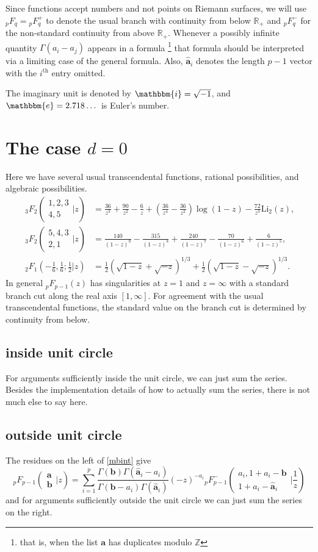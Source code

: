 \documentclass[12pt]{article}
\newcommand{\ee}[0] {\mathbbm{e}}
\newcommand{\ii}[0] {\mathbbm{i}}
\numberwithin{equation}{section}
\newcommand{\FF}[6] {{}_{#1}{#2}_{#3} \left( \begin{array}{c} #4 \\ #5 \end{array} \Big| {#6}  \right)}
\newcommand{\FFe}[7] {{}_{#1}^{\,}{#2}_{#3}^{#4} \left( \begin{array}{c} #5 \\ #6 \end{array} \Big| {#7} \right)}
\newcommand{\FFf}[5] {{}_{#1}{#2}_{#3} \left(#4 | {#5} \right)}
\newcommand{\bfa}[0] {\mathbf{a}}
\begin{document}
Since functions accept numbers and not points on Riemann surfaces, we will use ${}_p F_{q} = {}_p F_{q}^{+}$ to denote the usual branch with continuity from below $\mathbb{R}_{+}$ and ${}_p^{\,} F_{q}^{-}$ for the non-standard continuity from above $\mathbb{R}_{+}$. Whenever a possibly infinite quantity $\Gamma(a_i-a_j)$ appears in a formula \footnote{that is, when the list $\bfa$ has duplicates modulo $\mathbb{Z}$} that formula should be interpreted via a limiting case of the general formula. Also, $\hat{\mathbf{a}}_i$ denotes the length $p-1$ vector with the $i^{\text{th}}$ entry omitted.

The imaginary unit is denoted by $\ii = \sqrt{-1}$, and $\ee = 2.718\dots$ is Euler's number.

\section{The case $d=0$}
Here we have several usual transcendental functions, rational possibilities, and algebraic possibilities.
\begin{align*}
\FF{3}{F}{2}{1,2,3}{4,5}{z} &= \frac{36}{z^3}+\frac{90}{z^2}-\frac{6}{z}+\left
   (\frac{36}{z^4}-\frac{36}{z^2}\right) \log
   (1-z)-\frac{72}{z^3}
   \text{Li}_2(z)\text{,}\\
\FF{3}{F}{2}{5,4,3}{2,1}{z} &= \frac{140}{(1-z)^9}-\frac{315}{(1-z)^8}+\frac{240}{(1-z)^7}-\frac{70}{(1-z)^6}+\frac{6}{(1-z)^5}\text{,}\\
\FFf{2}{F}{1}{-\tfrac{1}{6}, \tfrac{1}{6};\tfrac{1}{2}}{z} &= \tfrac{1}{2} \left(\sqrt{1-z}+\sqrt{-z}\right)^{1/3}+\tfrac{1}{2} \left(\sqrt{1-z}-\sqrt{-z}\right)^{1/3}\text{.}
\end{align*}
In general ${}_{p}F_{p-1}(z)$ has singularities at $z=1$ and $z=\infty$ with a standard branch cut along the real axis $[1,\infty]$. For agreement with the usual transcendental functions, the standard value on the branch cut is determined by continuity from below.

\subsection{inside unit circle}
For arguments sufficiently inside the unit circle, we can just sum the series. Besides the implementation details of how to actually sum the series, there is not much else to say here.

\subsection{outside unit circle}
The residues on the left of \eqref{mbint} give
\begin{equation}
\label{balanced_outside}
\FF{p}{F}{p-1}{\mathbf{a}}{\mathbf{b}}{z} = \sum_{i=1}^{p} \frac{\Gamma(\mathbf{b}) \Gamma(\hat{\mathbf{a}}_i-a_i)}{\Gamma(\mathbf{b}-a_i) \Gamma(\hat{\mathbf{a}}_i)} (-z)^{-a_i} \FFe{p}{F}{p-1}{-}{a_i,1+a_i-\mathbf{b}}{1+a_i-\hat{\mathbf{a}}_i}{\frac{1}{z}}
\end{equation}
and for arguments sufficiently outside the unit circle we can just sum the series on the right.
\end{document}
